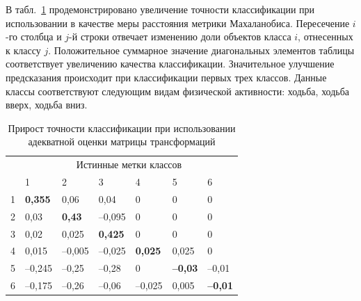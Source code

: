 	В табл.~\ref{improvement} продемонстрировано увеличение точности классификации при использовании в качестве меры расстояния метрики Махаланобиса.
	Пересечение $i$-го столбца и $j$-й строки отвечает изменению доли объектов класса $i$, отнесенных к классу $j$. Положительное суммарное значение диагональных элементов таблицы соответствует увеличению качества классификации. Значительное улучшение предсказания происходит при классификации первых трех классов.
	Данные классы соответствуют следующим видам физической активности: ходьба, ходьба вверх, ходьба вниз.
	
	\begin{table}[!ht]
		\centering
		\caption{Прирост точности классификации при использовании адекватной оценки матрицы трансформаций}
		\label{improvement}
		\begin{tabular}{|l|l|l|l|l|l|l|}
			\hline
			\multirow{2}{*}{} & \multicolumn{6}{c|}{Истинные метки классов}       \\ \cline{2-7}
			& 1      & 2      & 3      & 4      & 5     & 6     \\ \hline
			1   & \textbf{0,355}  & 0,06   & 0,04   & 0      & 0     & 0     \\ \hline
			2   & 0,03   & \textbf{0,43}   & --0,095 & 0      & 0     & 0     \\ \hline
			3   & 0,02   & 0,025  & \textbf{0,425}  & 0      & 0     & 0     \\ \hline
			4   & 0,015  & --0,005 & --0,025 & \textbf{0,025}  & 0,025 & 0     \\ \hline
			5   & --0,245 & --0,25  & --0,28  & 0      & \textbf{--0,03} & --0,01 \\ \hline
			6   & --0,175 & --0,26  & --0,06  & --0,025 & 0,005 & \textbf{--0,01} \\ \hline
		\end{tabular}
	\end{table}
	